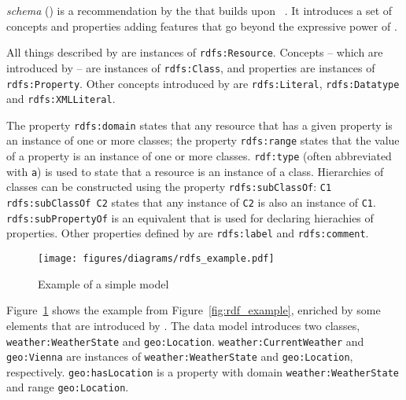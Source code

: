 \vspace{1em}

 \emph{schema} () is a recommendation by the  that builds upon ~\cite{RDFS}. It introduces a set of concepts and properties adding features that go beyond the expressive power of .

All things described by  are instances of \texttt{rdfs:Resource}. Concepts -- which are introduced by  -- are instances of \texttt{rdfs:Class}, and properties are instances of \texttt{rdfs:\hspace{0pt}Property}. Other concepts introduced by  are \texttt{rdfs:\hspace{0pt}Literal}, \texttt{rdfs:\hspace{0pt}Datatype} and \texttt{rdfs:\hspace{0pt}XMLLiteral}.

The property \texttt{rdfs:domain} states that any resource that has a given property is an instance of one or more classes; the property \texttt{rdfs:range} states that the value of a property is an instance of one or more classes. \texttt{rdf:type} (often abbreviated with \texttt{a}) is used to state that a resource is an instance of a class. Hierarchies of classes can be constructed using the property \texttt{rdfs:subClassOf}: \texttt{C1 rdfs:subClassOf C2} states that any instance of \texttt{C2} is also an instance of \texttt{C1}. \texttt{rdfs:subPropertyOf} is an equivalent that is used for declaring hierachies of properties. Other properties defined by  are \texttt{rdfs:label} and \texttt{rdfs:comment}.

\begin{figure}
\centering
\texttt{[image: figures/diagrams/rdfs\_example.pdf]}
\caption{Example of a simple  model}
\label{fig:rdfs_example}
\end{figure}

Figure~\ref{fig:rdfs_example} shows the example from Figure~\ref{fig:rdf_example}, enriched by some elements that are introduced by . The data model introduces two classes, \texttt{weather:\hspace{0pt}Weather\hspace{0pt}State} and \texttt{geo:\hspace{0pt}Location}. \texttt{weather:\hspace{0pt}CurrentWeather} and \texttt{geo:\hspace{0pt}Vienna} are instances of \texttt{weather:\hspace{0pt}Weather\hspace{0pt}State} and \texttt{geo:\hspace{0pt}Location}, respectively. \texttt{geo:\hspace{0pt}has\hspace{0pt}Location} is a property with domain \texttt{weather:\hspace{0pt}Weather\hspace{0pt}State} and range \texttt{geo:\hspace{0pt}Location}.

